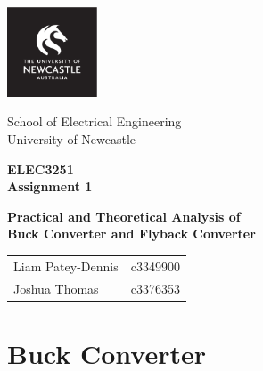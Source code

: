 \documentclass[12pt,twoside]{scrartcl}
\begin{document}
\setcounter{page}{1}
\begin{titlepage}
    \begin{center}

        \includegraphics[width=0.2\textwidth]{LOGO_Square.pdf}

        \vspace*{0.4cm}
        School of Electrical Engineering \\
        University of Newcastle
        
        \vspace{1cm}
        \huge
        \textbf{\textsf{ELEC3251 \\ Assignment 1}}

        \vspace{0.5cm}
        \large
        \textbf{\textsf{Practical and Theoretical Analysis of \\ Buck Converter and Flyback Converter}}

        \vspace{1.5cm}
        \normalsize
        \begin{tabular}{l|r}
            Liam Patey-Dennis & c3349900 \\
            Joshua Thomas & c3376353
        \end{tabular}
        \vfill    
    \end{center}
\end{titlepage}


\section{Buck Converter}
\end{document}
